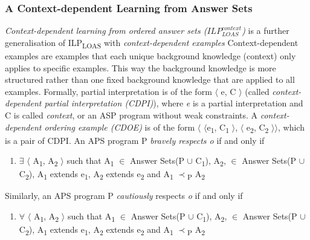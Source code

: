 \documentclass[12pt,twoside]{report}
\theoremstyle{plain}
\theoremstyle{definition}
\begin{document}
\subsubsection{A Context-dependent Learning from Answer Sets }
\textit{Context-dependent learning from ordered answer sets ($ILP_{LOAS}^{context}$)} is a further generalisation of ILP\textsubscript{LOAS} with \textit{context-dependent examples} \cite{Law2016}
Context-dependent examples are examples that each unique background knowledge (context) only applies to specific examples. This way the background knowledge is more structured rather than one fixed background knowledge that are applied to all examples.
Formally, partial interpretation is of the form $\langle$ e, C $\rangle$ (called \textit{context-dependent partial interpretation (CDPI)}), where \textit{e} is a partial interpretation and C is called \textit{context}, or an ASP program without weak constraints.
A \textit{context-dependent ordering example (CDOE)} is of the form $\langle$ $\langle$e\textsubscript{1}, C\textsubscript{1} $\rangle$, $\langle$ e\textsubscript{2}, C\textsubscript{2} $\rangle$$\rangle$, which is a pair of CDPI. An APS program P \textit{bravely respects o} if and only if
\begin{enumerate}
 \item $\exists$ $\langle$ A\textsubscript{1}, A\textsubscript{2} $\rangle$ such that A\textsubscript{1} $\in$ Answer Sets(P $\cup$ C\textsubscript{1}),  A\textsubscript{2}, $\in$ Answer Sets(P $\cup$ C\textsubscript{2}), A\textsubscript{1} extends e\textsubscript{1}, A\textsubscript{2} extends e\textsubscript{2} and A\textsubscript{1} $\prec$\textsubscript{P} A\textsubscript{2}
\end{enumerate}

 Similarly, an APS program P \textit{cautiously} respects \textit{o} if and only if
\begin{enumerate}
 \item $\forall$ $\langle$ A\textsubscript{1}, A\textsubscript{2} $\rangle$ such that A\textsubscript{1} $\in$ Answer Sets(P $\cup$ C\textsubscript{1}),  A\textsubscript{2}, $\in$ Answer Sets(P $\cup$ C\textsubscript{2}), A\textsubscript{1} extends e\textsubscript{1}, A\textsubscript{2} extends e\textsubscript{2} and A\textsubscript{1} $\prec$\textsubscript{P} A\textsubscript{2}
\end{enumerate}
\end{document}
